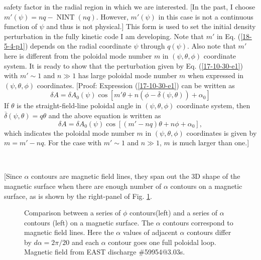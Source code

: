 \documentclass{article}
\newcommand{\tmop}[1]{\ensuremath{\operatorname{#1}}}
\begin{document}
safety factor in the radial region in which we are interested. [In the past, I
choose $m' (\psi) = n q - \tmop{NINT} (n q)$. However, $m' (\psi)$ in this
case is not a continuous function of $\psi$ and thus is not physical.] This
form is used to set the initial density perturbation in the fully kinetic code
I am developing. Note that $m'$ in Eq. (\ref{18-5-4-p1}) depends on the radial
coordinate $\psi$ through $q (\psi)$. Also note that $m'$ here is different
from the poloidal mode number $m$ in $(\psi, \theta, \phi)$ coordinate system.
It is ready to show that the perturbation given by Eq. (\ref{17-10-30-e1})
with $m' \sim 1$ and $n \gg 1$ has large poloidal mode number $m$ when
expressed in $(\psi, \theta, \phi)$ coordinates. [Proof: Expression
(\ref{17-10-30-e1}) can be written as
\begin{equation}
  \delta A = \delta A_0 (\psi) \cos [m' \theta + n (\phi - \overline{\delta}
  (\psi, \theta)) + \alpha_0]
\end{equation}
If $\theta$ is the straight-field-line poloidal angle in $(\psi, \theta,
\phi)$ coordinate system, then $\overline{\delta} (\psi, \theta) = q \theta$
and the above equation is written as
\[ \delta A = \delta A_0 (\psi) \cos [(m' - n q) \theta + n \phi + \alpha_0],
\]
which indicates the poloidal mode number $m$ in $(\psi, \theta, \phi)$
coordinates is given by $m = m' - n q$. For the case with $m' \sim 1$ and $n
\gg 1$, $m$ is much larger than one.]

\

[Since $\alpha$ contours are magnetic field lines, they span out the 3D shape
of the magnetic surface when there are enough number of $\alpha$ contours on a
magnetic surface, as is shown by the right-panel of Fig. \ref{17-10-29-e1}.

\begin{figure}[h]
  \caption{\label{17-10-29-e1}Comparison between a series of $\phi$
  contours(left) and a series of $\alpha$ contours (left) on a magnetic
  surface. The $\alpha$ contours correspond to magnetic field lines. Here the
  $\alpha$ values of adjacent $\alpha$ contours differ by $d \alpha = 2 \pi /
  20$ and each $\alpha$ contour goes one full poloidal loop. Magnetic field
  from EAST discharge \#59954@3.03s.}
\end{figure}

\

\
\end{document}
